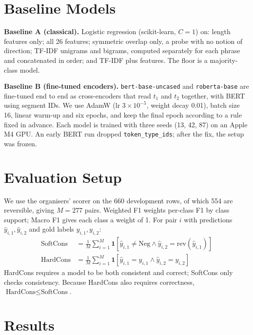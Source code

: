 \documentclass[10pt,a4paper,twocolumn]{article}
\begin{document}
\section{Baseline Models}

\textbf{Baseline A (classical).} Logistic regression (scikit-learn, $C = 1$) on: length features only; all 26 features; symmetric overlap only, a probe with no notion of direction; TF-IDF unigrams and bigrams, computed separately for each phrase and concatenated in order; and TF-IDF plus features. The floor is a majority-class model.

\textbf{Baseline B (fine-tuned encoders).} \texttt{bert-base-uncased} \citep{devlin2019bert} and \texttt{roberta-base} \citep{liu2019roberta} are fine-tuned end to end as cross-encoders that read $t_1$ and $t_2$ together, with BERT using segment IDs. We use AdamW (lr $3 \times 10^{-5}$, weight decay 0.01), batch size 16, linear warm-up and six epochs, and keep the final epoch according to a rule fixed in advance. Each model is trained with three seeds (13, 42, 87) on an Apple M4 GPU. An early BERT run dropped \texttt{token\_type\_ids}; after the fix, the setup was frozen.

\section{Evaluation Setup}
\label{sec:eval}

We use the organisers' scorer on the 660 development rows, of which 554 are reversible, giving $M = 277$ pairs. Weighted F1 weights per-class F1 by class support; Macro F1 gives each class a weight of 1. For pair $i$ with predictions $\hat{y}_{i,1}, \hat{y}_{i,2}$ and gold labels $y_{i,1}, y_{i,2}$:
\begin{align}
\text{SoftCons} &= \frac{1}{M}\sum_{i=1}^{M} \mathbf{1}\left[\hat{y}_{i,1} \neq \text{Neg} \wedge \hat{y}_{i,2} = \mathrm{rev}(\hat{y}_{i,1})\right] \\
\text{HardCons} &= \frac{1}{M}\sum_{i=1}^{M} \mathbf{1}\left[\hat{y}_{i,1} = y_{i,1} \wedge \hat{y}_{i,2} = y_{i,2}\right]
\end{align}
HardCons requires a model to be both consistent and correct; SoftCons only checks consistency. Because HardCons also requires correctness, $\text{HardCons} \leq \text{SoftCons}$.

\section{Results}
\end{document}

